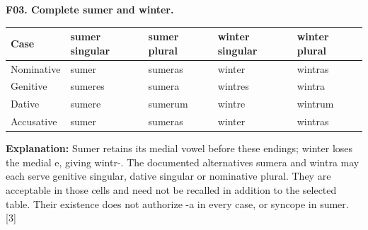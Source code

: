\par\begin{minipage}{\linewidth}\raggedright
\textbf{F03. Complete sumer and winter.}

\par\begingroup
\fontsize{10.5}{13.2}\selectfont
\setlength{\LTleft}{0pt}\setlength{\LTright}{\fill}
\noindent
\begin{tabular}{@{}>{\raggedright\arraybackslash}p{21.75mm}>{\raggedright\arraybackslash}p{23.27mm}>{\raggedright\arraybackslash}p{21.75mm}>{\raggedright\arraybackslash}p{24.25mm}>{\raggedright\arraybackslash}p{21.75mm}@{}}
\toprule
\textbf{Case} & \textbf{sumer singular} & \textbf{sumer plural} & \textbf{winter singular} & \textbf{winter plural} \\
\midrule
Nominative & sumer & sumeras & winter & wintras \\
Genitive & sumeres & sumera & wintres & wintra \\
Dative & sumere & sumerum & wintre & wintrum \\
Accusative & sumer & sumeras & winter & wintras \\
\bottomrule
\end{tabular}
\par\endgroup

\textbf{Explanation:} Sumer retains its medial vowel before these endings; winter loses the medial e, giving wintr-. The documented alternatives sumera and wintra may each serve genitive singular, dative singular or nominative plural. They are acceptable in those cells and need not be recalled in addition to the selected table. Their existence does not authorize -a in every case, or syncope in sumer. [3]

\end{minipage}\par\addvspace{4pt}

